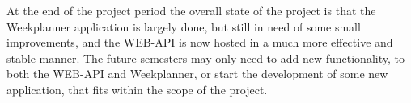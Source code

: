 At the end of the project period the overall state of the project is that the Weekplanner application is largely done, but still in need of some small improvements, and the WEB-API is now hosted in a much more effective and stable manner. 
The future semesters may only need to add new functionality, to both the WEB-API and Weekplanner, or start the development of some new application, that fits within the scope of the project.


\newpage
